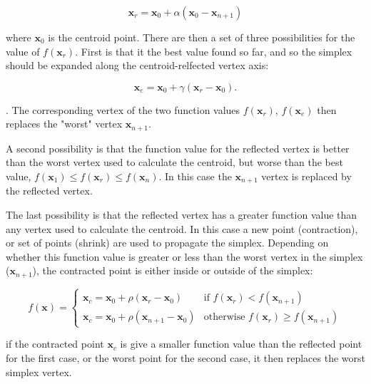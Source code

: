\begin{equation}
\mathbf{x}_r = \mathbf{x}_0 + \alpha\left(\mathbf{x}_0 - \mathbf{x}_{n+1}\right) 
\end{equation}

where $\mathbf{x}_0$ is the centroid point. There are then a set of three possibilities
for the value of $f\left(\mathbf{x}_r\right)$. First is that it the best value
found so far, and so the simplex should be expanded along the centroid-relfected 
vertex axis:

\begin{equation}
\mathbf{x}_e = \mathbf{x}_0 + \gamma\left(\mathbf{x}_r - \mathbf{x}_0 \right).
\end{equation}

. The corresponding vertex of the two function values $f\left(\mathbf{x}_r\right)$, 
$f\left(\mathbf{x}_e\right)$ then replaces the "worst" vertex $\mathbf{x}_{n+1}$.

A second possibility is that the function value for the reflected vertex is better
than the worst vertex used to calculate the centroid, but worse than the best 
value, $f\left(\mathbf{x}_1\right) \leq f\left(\mathbf{x}_r\right) \leq f\left(\mathbf{x}_n\right)$.
In this case the $\mathbf{x}_{n+1}$ vertex is replaced by the reflected vertex.

The last possibility is that the reflected vertex has a greater function value than
any vertex used to calculate the centroid. In this case a new point (contraction),
or set of points (shrink) are used to propagate the simplex. Depending on whether
this function value is greater or less than the worst vertex in the simplex ($\mathbf{x}_{n+1}$),
the contracted point is either inside or outside of the simplex:

\begin{equation}
    f\left(\mathbf{x}\right)= 
    \begin{cases}
    \mathbf{x}_c = \mathbf{x}_0 + \rho \left(\mathbf{x}_r - \mathbf{x}_0 \right)               & \text{if } f\left(\mathbf{x}_r\right) < f\left(\mathbf{x}_{n+1}\right)\\
    \mathbf{x}_c = \mathbf{x}_0 + \rho \left(\mathbf{x}_{n+1} - \mathbf{x}_0 \right)           & \text{otherwise } f\left(\mathbf{x}_r\right) \geq f\left(\mathbf{x}_{n+1}\right)
    \end{cases}
\end{equation}

if the contracted point $\mathbf{x}_c$ is give a smaller function value than the 
reflected point for the first case, or the worst point for the second case, it then
replaces the worst simplex vertex.

